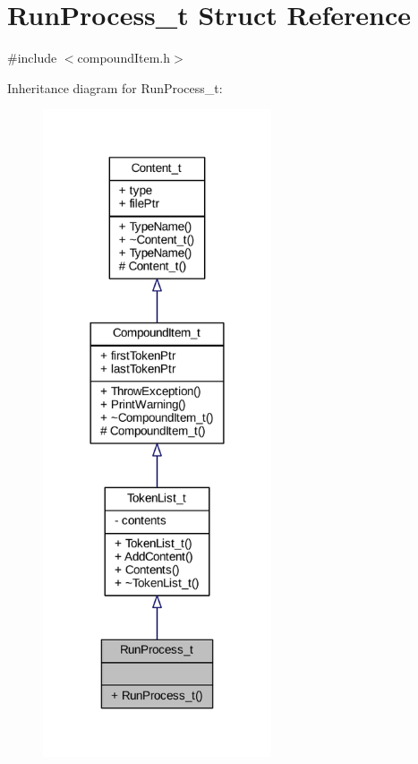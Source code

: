 \hypertarget{struct_run_process__t}{}\section{Run\+Process\+\_\+t Struct Reference}
\label{struct_run_process__t}


{\ttfamily \#include $<$compound\+Item.\+h$>$}



Inheritance diagram for Run\+Process\+\_\+t\+:
\nopagebreak
\begin{figure}[H]
\begin{center}
\leavevmode
\includegraphics[width=191pt]{struct_run_process__t__inherit__graph}
\end{center}
\end{figure}


